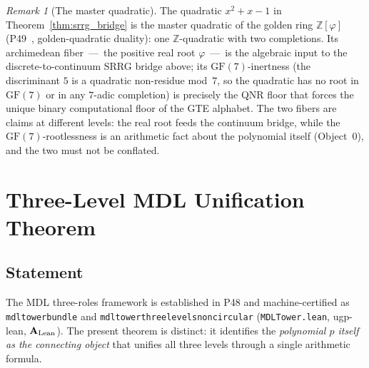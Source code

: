 \documentclass[11pt]{article}
\theoremstyle{remark}
\newtheorem{remark}[theorem]{Remark}
\newcommand{\GF}[1]{\ensuremath{\mathrm{GF}(#1)}}
\newcommand{\lean}[1]{%
  \penalty-100
  \begingroup\def\_{\textunderscore\allowbreak}\texttt{#1}\endgroup}
\newcommand{\CatAL}{\ensuremath{\textbf{A}_{\rm Lean}}}
\begin{document}
\begin{remark}[The master quadratic]
\label{rem:master_quadratic}
The quadratic $x^2 + x - 1$ in Theorem~\ref{thm:srrg_bridge} is the master
quadratic of the golden ring $\mathbb{Z}[\varphi]$
(P49~\cite{SpivackGTEPolynomialWolfram}, golden-quadratic duality): one
$\mathbb{Z}$-quadratic with two completions. Its archimedean fiber~---~the
positive real root $\varphi$~---~is the algebraic input to the
discrete-to-continuum SRRG bridge above; its $\GF{7}$-inertness (the
discriminant $5$ is a quadratic non-residue mod~$7$, so the quadratic has
no root in $\GF{7}$ or in any $7$-adic completion) is precisely the QNR
floor that forces the unique binary computational floor of the GTE
alphabet. The two fibers are claims at different levels: the real root
feeds the continuum bridge, while the $\GF{7}$-rootlessness is an
arithmetic fact about the polynomial itself (Object~0), and the two must
not be conflated.
\end{remark}


\section{Three-Level MDL Unification Theorem}
\label{sec:unification}

\subsection{Statement}
\label{sec:unif_statement}

The MDL three-roles framework is established in P48
\cite{SpivackGTECompleteFramework} and machine-certified as
\lean{mdl\_tower\_bundle} and \lean{mdl\_tower\_three\_levels\_non\_circular}
(\texttt{MDLTower.lean}, ugp-lean, \CatAL). The present theorem is distinct:
it identifies the \emph{polynomial $p$ itself as the connecting object} that
unifies all three levels through a single arithmetic formula.
\end{document}
